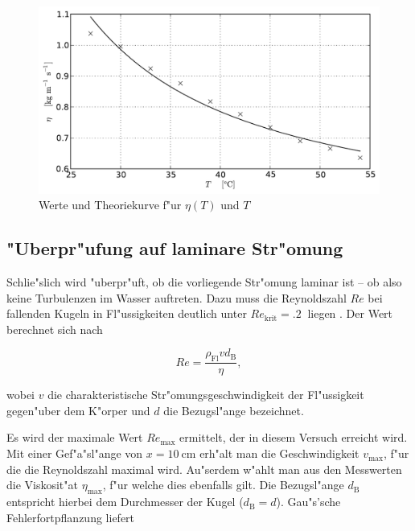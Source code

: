 		\begin{figure}[h!]
			\centering
			\includegraphics[width = 15cm]{img/plot2.pdf}
			\caption{Werte und Theoriekurve f"ur $\eta(T)$ und $T$}
			\label{fig:graph}
		\end{figure}

	\clearpage

	\subsection{"Uberpr"ufung auf laminare Str"omung}
		\label{sub:laminar}

		Schlie"slich wird "uberpr"uft, ob die vorliegende Str"omung laminar ist -- ob also keine Turbulenzen im Wasser auftreten.
		Dazu muss die Reynoldszahl $Re$ bei fallenden Kugeln in Fl"ussigkeiten deutlich unter $Re_\mathrm{krit} = \SI{.2}{}$ liegen \cite{walcher}.
		Der Wert berechnet sich nach

		\begin{equation*}
			Re = \frac{\rho_\mathrm{Fl} v d_\mathrm{B}}{\eta} ,
		\end{equation*}

		wobei $v$ die charakteristische Str"omungsgeschwindigkeit der Fl"ussigkeit gegen"uber dem K"orper und $d$ die Bezugsl"ange bezeichnet.

		Es wird der maximale Wert $Re_\mathrm{max}$ ermittelt, der in diesem Versuch erreicht wird.
		Mit einer Gef"a"sl"ange von $x = \SI{10}{\centi \meter}$ erh"alt man die Geschwindigkeit $v_\mathrm{max}$, f"ur die die Reynoldszahl maximal wird.
		Au"serdem w"ahlt man aus den Messwerten die Viskosit"at $\eta_\mathrm{max}$, f"ur welche dies ebenfalls gilt.
		Die Bezugsl"ange $d_\mathrm{B}$ entspricht hierbei dem Durch\-messer der Kugel ($d_\mathrm{B} = d$).
		Gau"s'sche Fehlerfortpflanzung liefert

